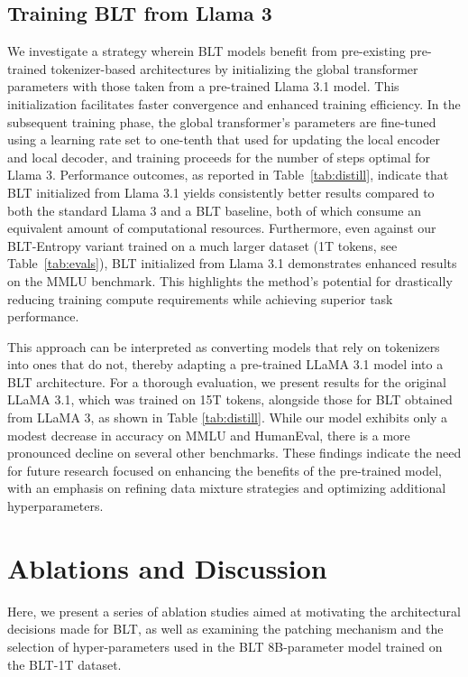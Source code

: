 \subsection{Training {\textsc BLT} from Llama 3}
\label{sec:distillation}
We investigate a strategy wherein {\textsc BLT} models benefit from pre-existing pre-trained tokenizer-based architectures by initializing the global transformer parameters with those taken from a pre-trained Llama 3.1 model. This initialization facilitates faster convergence and enhanced training efficiency. In the subsequent training phase, the global transformer's parameters are fine-tuned using a learning rate set to one-tenth that used for updating the local encoder and local decoder, and training proceeds for the number of steps optimal for Llama 3. Performance outcomes, as reported in Table~\ref{tab:distill}, indicate that {\textsc BLT} initialized from Llama 3.1 yields consistently better results compared to both the standard Llama 3 and a {\textsc BLT} baseline, both of which consume an equivalent amount of computational resources. Furthermore, even against our {\textsc BLT}-Entropy variant trained on a much larger dataset (1T tokens, see Table~\ref{tab:evals}), {\textsc BLT} initialized from Llama 3.1 demonstrates enhanced results on the MMLU benchmark. This highlights the method's potential for drastically reducing training compute requirements while achieving superior task performance.

This approach can be interpreted as converting models that rely on tokenizers into ones that do not, thereby adapting a pre-trained LLaMA 3.1 model into a {\textsc BLT} architecture. For a thorough evaluation, we present results for the original LLaMA 3.1, which was trained on 15T tokens, alongside those for {\textsc BLT} obtained from LLaMA 3, as shown in Table \ref{tab:distill}. While our model exhibits only a modest decrease in accuracy on MMLU and HumanEval, there is a more pronounced decline on several other benchmarks. These findings indicate the need for future research focused on enhancing the benefits of the pre-trained model, with an emphasis on refining data mixture strategies and optimizing additional hyperparameters.

\section{Ablations and Discussion}
\label{section:ablations}
Here, we present a series of ablation studies aimed at motivating the architectural decisions made for {\textsc BLT}, as well as examining the patching mechanism and the selection of hyper-parameters used in the {\textsc BLT} 8B-parameter model trained on the {\textsc BLT}-1T dataset.

